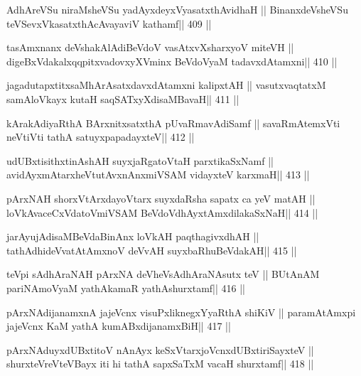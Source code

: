 \begin{shl}
AdhAreVSu niraMsheVSu yadAyxdeyxVyasatxthAvidhaH ||
BinanxdeVsheVSu teVSevxVkasatxthAcAvayaviV kathamf\hfill || 409 ||
\end{shl}

\begin{shl}
tasAmxnanx deVshakAlAdiBeVdoV vasAtxvXsharxyoV miteVH ||
digeBxVdakalxqqpitxvadovxyXVminx BeVdoV\s yaM tadavxdAtamxni\hfill || 410 ||
\end{shl}

\begin{shl}
jagadutapxtitxsaMhArAsatxdavxdAtamxni kalipxtAH ||
vasutxvaqtatxM samAloVkayx kutaH saqSATxyXdisaMBavaH\hfill || 411 ||
\end{shl}

\begin{shl}
kArakAdiyaRthA BArxnitxsatxthA pUvaRmavAdiSamf ||
savaRmAtemxVti neVtiVti tathA satuyxpapadayxteV\hfill || 412 ||
\end{shl}

\begin{shl}
udUBxtisithxtinAshAH suyxjaRgatoV\s taH parxtikaSxNamf ||
avidAyxmAtarxheVtutAvxnAnxmiVSAM vidayxteV karxmaH\hfill || 413 ||
\end{shl}

\begin{shl}
pArxNAH shorxVtArxdayoV\s tarx suyxdaRsha sapatx ca yeV matAH ||
loVkAvaceCxVdatoV\s miVSAM BeVdoV\s dhAyxtAmxdilakaSxNaH\hfill || 414 ||
\end{shl}

\begin{shl}
jarAyujAdisaMBeVdaBinAnx loVkAH paqthagivxdhAH ||
tathA\s dhideVvatAtAmxnoV deVvAH suyxbaRhuBeVdakAH\hfill || 415 ||
\end{shl}

\begin{shl}
teV\s pi sAdhAraNAH pArxNA deVheV\s sAdhAraNAsutx teV ||
BUtAnAM pariNAmoV\s yaM yathAkamaR yathAshurxtamf\hfill || 416 ||
\end{shl}

\begin{shl}
pArxNAdijanamxnA jajeVcnx visuPxliknegxYyaRthA shiKiV ||
paramAtAmx\s pi jajeVcnx KaM yathA kumABxdijanamxBiH\hfill || 417 ||
\end{shl}

\begin{shl}
pArxNAduyxdUBxtitoV nAnAyx keSxVtarxjoVcnxdUBxtiriSayxteV ||
shurxteVreVteVBayx iti hi tathA sapxSaTxM vacaH shurxtamf\hfill || 418 ||
\end{shl}

